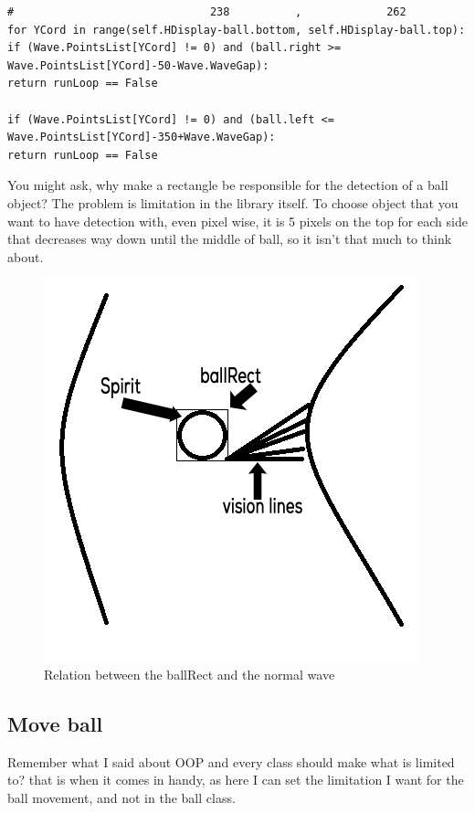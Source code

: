 \begin{listing}[H]
\begin{verbatim}
#                              238          ,             262
for YCord in range(self.HDisplay-ball.bottom, self.HDisplay-ball.top):
if (Wave.PointsList[YCord] != 0) and (ball.right >= Wave.PointsList[YCord]-50-Wave.WaveGap):
return runLoop == False

if (Wave.PointsList[YCord] != 0) and (ball.left <= Wave.PointsList[YCord]-350+Wave.WaveGap):
return runLoop == False
\end{verbatim}
\end{listing}

You might ask, why make a rectangle be responsible for the detection of a ball object? The problem is limitation in the library itself. To choose object that you want to have detection with, even pixel wise, it is 5 pixels on the top for each side that decreases way down until the middle of ball, so it isn't that much to think about.

\begin{figure}[H]
	\centering
	\includegraphics[width=0.7\linewidth]{usedImages/colliison}
	\caption{Relation between the ballRect and the normal wave}
	\label{fig:colliison}
\end{figure}


\subsection{Move ball}
Remember what I said about OOP and every class should make what is limited to? that is when it comes in handy, as here I can set the limitation I want for the ball movement, and not in the ball class.

